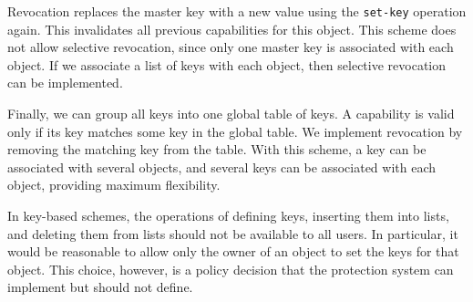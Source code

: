 Revocation replaces the master key with a new value using the \texttt{set-key} operation again.
This invalidates all previous capabilities for this object.
This scheme does not allow selective revocation, since only one master key is associated with each object.
If we associate a list of keys with each object, then selective revocation can be implemented.

Finally, we can group all keys into one global table of keys.
A capability is valid only if its key matches some key in the global table.
We implement revocation by removing the matching key from the table.
With this scheme, a key can be associated with several objects, and several keys can be associated with each object, providing maximum flexibility.

In key-based schemes, the operations of defining keys, inserting them into lists, and deleting them from lists should not be available to all users.
In particular, it would be reasonable to allow only the owner of an object to set the keys for that object.
This choice, however, is a policy decision that the protection system can implement but should not define.

